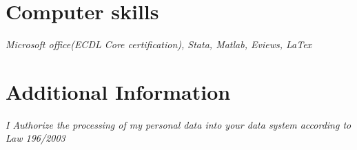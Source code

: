 \documentclass[10pt]{article} %
\begin{document}

\section{Computer skills}
\textit{Microsoft office(ECDL Core certification), Stata, Matlab, Eviews, LaTex}



\section{Additional Information}


\textit{I Authorize the processing of my personal data into your data system according to Law 196/2003}\\


\end{document}
